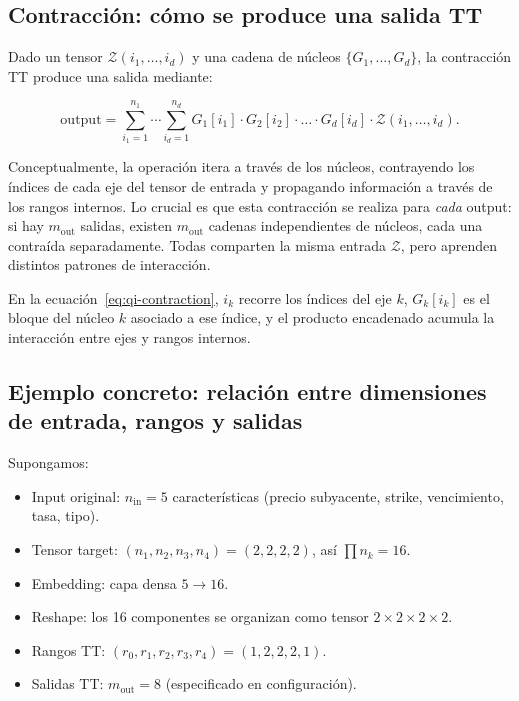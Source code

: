 \subsection{Contracción: cómo se produce una salida TT}

Dado un tensor $\mathcal{Z}(i_1, \ldots, i_d)$ y una cadena de núcleos $\{G_1, \ldots, G_d\}$, la contracción TT produce una salida mediante:

\begin{equation}
\text{output} = \sum_{i_1=1}^{n_1} \cdots \sum_{i_d=1}^{n_d}
G_1[i_1] \cdot G_2[i_2] \cdot \ldots \cdot G_d[i_d] \cdot \mathcal{Z}(i_1, \ldots, i_d).
\label{eq:qi-contraction}
\end{equation}

Conceptualmente, la operación itera a través de los núcleos, contrayendo los índices de cada eje del tensor de entrada y propagando información a través de los rangos internos. Lo crucial es que esta contracción se realiza para \emph{cada} output: si hay $m_{\text{out}}$ salidas, existen $m_{\text{out}}$ cadenas independientes de núcleos, cada una contraída separadamente. Todas comparten la misma entrada $\mathcal{Z}$, pero aprenden distintos patrones de interacción.

En la ecuación~\ref{eq:qi-contraction}, $i_k$ recorre los índices del eje $k$, $G_k[i_k]$ es el bloque del núcleo $k$ asociado a ese índice, y el producto encadenado acumula la interacción entre ejes y rangos internos.

\subsection{Ejemplo concreto: relación entre dimensiones de entrada, rangos y salidas}

Supongamos:
\begin{itemize}
  \item Input original: $n_{\text{in}} = 5$ características (precio subyacente, strike, vencimiento, tasa, tipo).
  \item Tensor target: $(n_1, n_2, n_3, n_4) = (2, 2, 2, 2)$, así $\prod n_k = 16$.
  \item Embedding: capa densa $5 \to 16$.
  \item Reshape: los 16 componentes se organizan como tensor $2 \times 2 \times 2 \times 2$.
  \item Rangos TT: $(r_0, r_1, r_2, r_3, r_4) = (1, 2, 2, 2, 1)$.
  \item Salidas TT: $m_{\text{out}} = 8$ (especificado en configuración).
\end{itemize}

